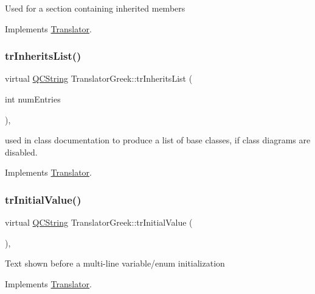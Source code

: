 Used for a section containing inherited members 

Implements \mbox{\hyperlink{class_translator}{Translator}}.

\mbox{\label{class_translator_greek_a6a9bd657b94b41190ccd80bdcd261f25}} 
\subsubsection{\texorpdfstring{trInheritsList()}{trInheritsList()}}
{\footnotesize\ttfamily virtual \mbox{\hyperlink{class_q_c_string}{Q\+C\+String}} Translator\+Greek\+::tr\+Inherits\+List (\begin{DoxyParamCaption}\item[{int}]{num\+Entries }\end{DoxyParamCaption})\hspace{0.3cm}{\ttfamily [inline]}, {\ttfamily [virtual]}}

used in class documentation to produce a list of base classes, if class diagrams are disabled. 

Implements \mbox{\hyperlink{class_translator}{Translator}}.

\mbox{\label{class_translator_greek_a7fbf0b897f0cd94f5e492b7f2b1505df}} 
\subsubsection{\texorpdfstring{trInitialValue()}{trInitialValue()}}
{\footnotesize\ttfamily virtual \mbox{\hyperlink{class_q_c_string}{Q\+C\+String}} Translator\+Greek\+::tr\+Initial\+Value (\begin{DoxyParamCaption}{ }\end{DoxyParamCaption})\hspace{0.3cm}{\ttfamily [inline]}, {\ttfamily [virtual]}}

Text shown before a multi-\/line variable/enum initialization 

Implements \mbox{\hyperlink{class_translator}{Translator}}.

\mbox{\label{class_translator_greek_a68dffd25921753ff383084a7b9740efd}} 

